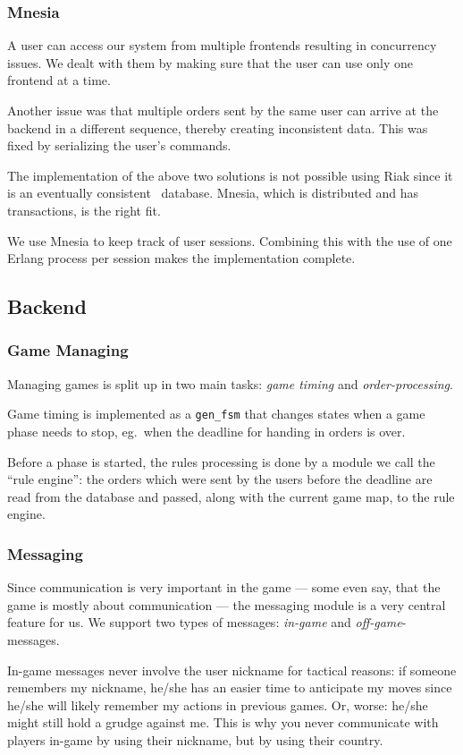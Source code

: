 \documentclass[11pt,a4paper]{report}
\begin{document}
\subsubsection{Mnesia}
\label{sec:mnesia}
A user can access our system from multiple frontends resulting in
concurrency issues. We dealt with them by making sure that the user
can use only one frontend at a time.

Another issue was that multiple orders sent by the same user can arrive at the
backend in a different sequence, thereby creating inconsistent data. This was
fixed by serializing the user's commands.

The implementation of the above two solutions is not possible using Riak since
it is an eventually consistent~\cite{eventual_consistency} database.
Mnesia, which is distributed and has transactions, is the right fit.

We use Mnesia to keep track of user sessions. Combining this with
the use of one Erlang process per session makes the implementation complete.


\subsection{Backend}
\subsubsection{Game Managing}
Managing games is split up in two main tasks: {\em game timing\/} and
{\em order-processing}.

Game timing is implemented as a {\tt gen\_fsm} that changes states when a game
phase needs to stop, eg.\ when the deadline for handing in orders is over.

Before a phase is started, the rules processing is done by a module we call
the ``rule engine'': the orders which were sent by the users before the
deadline are read from the database and passed, along with the current game
map, to the rule engine.
\subsubsection{Messaging}
Since communication is very important in the game --- some even say, that the
game is mostly about communication --- the messaging module is a very central
feature for us. We support two types of messages: {\em in-game\/} and
{\em off-game\/}-messages.

In-game messages never involve the user nickname for tactical reasons: if someone
remembers my nickname, he/she has an easier time to anticipate my moves since he/she
will likely remember my actions in previous games.
Or, worse: he/she might still hold a grudge against me. This is why you never
communicate with players in-game by using their nickname, but by using their
country.
\end{document}
